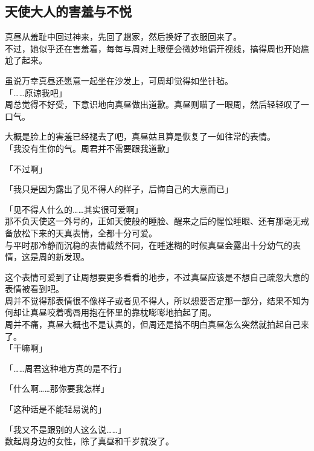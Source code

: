 \subsection{天使大人的害羞与不悦}

真昼从羞耻中回过神来，先回了趟家，然后换好了衣服回来了。\\

不过，她似乎还在害羞着，每每与周对上眼便会微妙地偏开视线，搞得周也开始尴尬了起来。

虽说万幸真昼还愿意一起坐在沙发上，可周却觉得如坐针毡。\\

「……原谅我吧」\\

周总觉得不好受，下意识地向真昼做出道歉。真昼则瞄了一眼周，然后轻轻叹了一口气。

大概是脸上的害羞已经褪去了吧，真昼姑且算是恢复了一如往常的表情。\\

「我没有生你的气。周君并不需要跟我道歉」

「不过啊」

「我只是因为露出了见不得人的样子，后悔自己的大意而已」

「见不得人什么的……其实很可爱啊」\\

那不负天使这一外号的，正如天使般的睡脸、醒来之后的惺忪睡眼、还有那毫无戒备放松下来的天真表情，全都十分可爱。\\

与平时那冷静而沉稳的表情截然不同，在睡迷糊的时候真昼会露出十分幼气的表情，这是周的新发现。

这个表情可爱到了让周想要更多看看的地步，不过真昼应该是不想自己疏忽大意的表情被看到吧。\\

周并不觉得那表情很不像样子或者见不得人，所以想要否定那一部分，结果不知为何却让真昼咬着嘴唇用抱在怀里的靠枕嘭嘭地拍起了周。\\

周并不痛，真昼大概也不是认真的，但周还是搞不明白真昼怎么突然就拍起自己来了。\\

「干嘛啊」

「……周君这种地方真的是不行」

「什么啊……那你要我怎样」

「这种话是不能轻易说的」

「我又不是跟别的人这么说……」\\

数起周身边的女性，除了真昼和千岁就没了。

